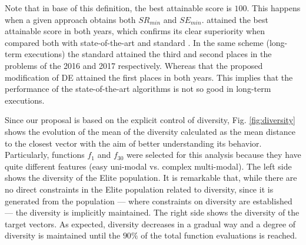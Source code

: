 Note that in base of this definition, the best attainable score is $100$.
%
This happens when a given approach obtains both $SR_{min}$ and $SE_{min}$.
%
\DEEDM{} attained the best attainable score in both years, which confirms its clear superiority when compared both with state-of-the-art and standard \DE{}.
%
In the same scheme (long-term executions) the standard \DE{} attained the third and second places in the problems of the \CEC{} 2016 and \CEC{} 2017 respectively.
%
Whereas that the proposed modification of DE attained the first places in both years.
%
This implies that the performance of the state-of-the-art algorithms is not so good in long-term executions.
%
%
%
%


Since our proposal is based on the explicit control of diversity, Fig. \ref{fig:diversity} shows the evolution of the mean of the diversity calculated
as the mean distance to the closest vector with the aim of better understanding its behavior.
%
Particularly, functions $f_1$ and $f_{30}$ were selected for this analysis because they have quite different features (easy uni-modal vs. complex multi-modal).
%
The left side shows the diversity of the Elite population.
%
It is remarkable that, while there are no direct constraints in the Elite population related to diversity, since it is generated from the population --- where constraints on diversity
are established --- the diversity is implicitly maintained.
%
The right side shows the diversity of the target vectors.
%
As expected, diversity decreases in a gradual way and a degree of diversity is maintained until the $90\%$ of the total function evaluations is reached.

